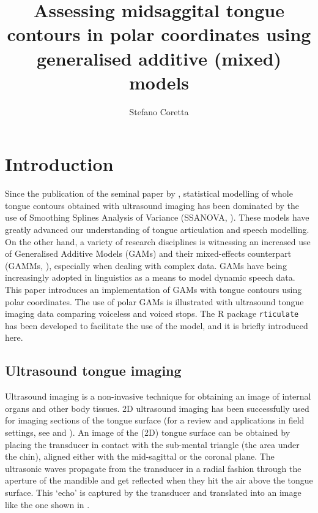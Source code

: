 \documentclass[12pt,]{article}
\title{Assessing midsaggital tongue contours in polar coordinates using
generalised additive (mixed) models}
\author{Stefano Coretta}
\date{}
\begin{document}
\maketitle

\hypertarget{introduction}{%
\section{Introduction}\label{introduction}}

Since the publication of the seminal paper by \citet{davidson2006},
statistical modelling of whole tongue contours obtained with ultrasound
imaging has been dominated by the use of Smoothing Splines Analysis of
Variance (SSANOVA, \citealt{gu2013}). These models have greatly advanced
our understanding of tongue articulation and speech modelling. On the
other hand, a variety of research disciplines is witnessing an increased
use of Generalised Additive Models (GAMs) and their mixed-effects
counterpart (GAMMs, \citealt{wood2006}), especially when dealing with
complex data. GAMs have being increasingly adopted in linguistics as a
means to model dynamic speech data. This paper introduces an
implementation of GAMs with tongue contours using polar coordinates. The
use of polar GAMs is illustrated with ultrasound tongue imaging data
comparing voiceless and voiced stops. The R package \texttt{rticulate}
has been developed to facilitate the use of the model, and it is briefly
introduced here.

\hypertarget{ultrasound-tongue-imaging}{%
\subsection{Ultrasound tongue imaging}\label{ultrasound-tongue-imaging}}

Ultrasound imaging is a non-invasive technique for obtaining an image of
internal organs and other body tissues. 2D ultrasound imaging has been
successfully used for imaging sections of the tongue surface (for a
review and applications in field settings, see \citealt{gick2002} and
\citealt{lulich2018}). An image of the (2D) tongue surface can be
obtained by placing the transducer in contact with the sub-mental
triangle (the area under the chin), aligned either with the mid-sagittal
or the coronal plane. The ultrasonic waves propagate from the transducer
in a radial fashion through the aperture of the mandible and get
reflected when they hit the air above the tongue surface. This `echo' is
captured by the transducer and translated into an image like the one
shown in .
\end{document}
